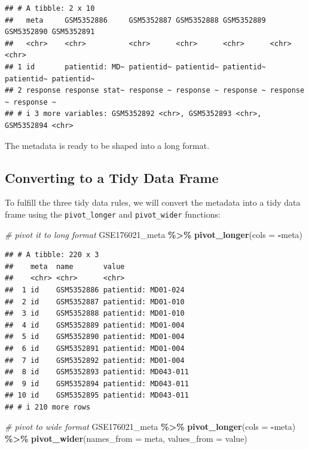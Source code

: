 \documentclass[
]{book}
\newenvironment{Shaded}{\begin{snugshade}}{\end{snugshade}}
\newcommand{\AttributeTok}[1]{\textcolor[rgb]{0.13,0.29,0.53}{#1}}
\newcommand{\CommentTok}[1]{\textcolor[rgb]{0.56,0.35,0.01}{\textit{#1}}}
\newcommand{\FunctionTok}[1]{\textcolor[rgb]{0.13,0.29,0.53}{\textbf{#1}}}
\newcommand{\NormalTok}[1]{#1}
\newcommand{\SpecialCharTok}[1]{\textcolor[rgb]{0.81,0.36,0.00}{\textbf{#1}}}
\begin{document}
\begin{verbatim}
## # A tibble: 2 x 10
##   meta     GSM5352886     GSM5352887 GSM5352888 GSM5352889 GSM5352890 GSM5352891
##   <chr>    <chr>          <chr>      <chr>      <chr>      <chr>      <chr>     
## 1 id       patientid: MD~ patientid~ patientid~ patientid~ patientid~ patientid~
## 2 response response stat~ response ~ response ~ response ~ response ~ response ~
## # i 3 more variables: GSM5352892 <chr>, GSM5352893 <chr>, GSM5352894 <chr>
\end{verbatim}

The metadata is ready to be shaped into a long format.

\hypertarget{converting-to-a-tidy-data-frame}{%
\subsection{Converting to a Tidy Data Frame}\label{converting-to-a-tidy-data-frame}}

To fulfill the three tidy data rules, we will convert the metadata into a tidy data frame using the \texttt{pivot\_longer} and \texttt{pivot\_wider} functions:

\begin{Shaded}
\begin{Highlighting}[]
\CommentTok{\# pivot it to long format}
\NormalTok{GSE176021\_meta }\SpecialCharTok{\%\textgreater{}\%}
  \FunctionTok{pivot\_longer}\NormalTok{(}\AttributeTok{cols =} \SpecialCharTok{{-}}\NormalTok{meta)}
\end{Highlighting}
\end{Shaded}

\begin{verbatim}
## # A tibble: 220 x 3
##    meta  name       value               
##    <chr> <chr>      <chr>               
##  1 id    GSM5352886 patientid: MD01-024 
##  2 id    GSM5352887 patientid: MD01-010 
##  3 id    GSM5352888 patientid: MD01-010 
##  4 id    GSM5352889 patientid: MD01-004 
##  5 id    GSM5352890 patientid: MD01-004 
##  6 id    GSM5352891 patientid: MD01-004 
##  7 id    GSM5352892 patientid: MD01-004 
##  8 id    GSM5352893 patientid: MD043-011
##  9 id    GSM5352894 patientid: MD043-011
## 10 id    GSM5352895 patientid: MD043-011
## # i 210 more rows
\end{verbatim}

\begin{Shaded}
\begin{Highlighting}[]
\CommentTok{\# pivot to wide format}
\NormalTok{GSE176021\_meta }\SpecialCharTok{\%\textgreater{}\%}
  \FunctionTok{pivot\_longer}\NormalTok{(}\AttributeTok{cols =} \SpecialCharTok{{-}}\NormalTok{meta) }\SpecialCharTok{\%\textgreater{}\%}
  \FunctionTok{pivot\_wider}\NormalTok{(}\AttributeTok{names\_from =}\NormalTok{ meta, }\AttributeTok{values\_from =}\NormalTok{ value)}
\end{Highlighting}
\end{Shaded}
\end{document}
